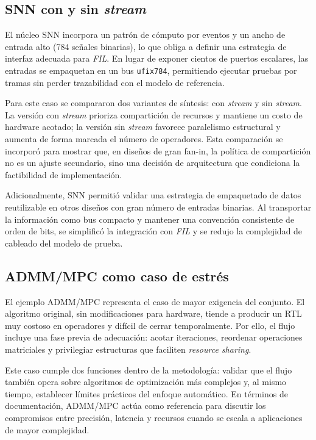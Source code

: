 \subsection{SNN con y sin \textit{stream}}

El núcleo SNN incorpora un patrón de cómputo por eventos y un ancho de entrada alto (784 señales binarias), lo que obliga a definir una estrategia de interfaz adecuada para \textit{FIL}. En lugar de exponer cientos de puertos escalares, las entradas se empaquetan en un bus \texttt{ufix784}, permitiendo ejecutar pruebas por tramas sin perder trazabilidad con el modelo de referencia.

Para este caso se compararon dos variantes de síntesis: con \textit{stream} y sin \textit{stream}. La versión con \textit{stream} prioriza compartición de recursos y mantiene un costo de hardware acotado; la versión sin \textit{stream} favorece paralelismo estructural y aumenta de forma marcada el número de operadores. Esta comparación se incorporó para mostrar que, en diseños de gran fan-in, la política de compartición no es un ajuste secundario, sino una decisión de arquitectura que condiciona la factibilidad de implementación.

Adicionalmente, SNN permitió validar una estrategia de empaquetado de datos reutilizable en otros diseños con gran número de entradas binarias. Al transportar la información como bus compacto y mantener una convención consistente de orden de bits, se simplificó la integración con \textit{FIL} y se redujo la complejidad de cableado del modelo de prueba.

\subsection{ADMM/MPC como caso de estrés}

El ejemplo ADMM/MPC representa el caso de mayor exigencia del conjunto. El algoritmo original, sin modificaciones para hardware, tiende a producir un RTL muy costoso en operadores y difícil de cerrar temporalmente. Por ello, el flujo incluye una fase previa de adecuación: acotar iteraciones, reordenar operaciones matriciales y privilegiar estructuras que faciliten \textit{resource sharing}.

Este caso cumple dos funciones dentro de la metodología: validar que el flujo también opera sobre algoritmos de optimización más complejos y, al mismo tiempo, establecer límites prácticos del enfoque automático. En términos de documentación, ADMM/MPC actúa como referencia para discutir los compromisos entre precisión, latencia y recursos cuando se escala a aplicaciones de mayor complejidad.

